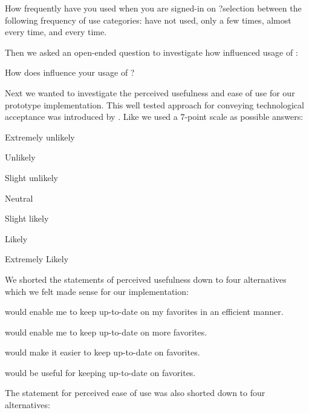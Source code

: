 \begin{items}
  \item How frequently have you used \latest{} when you are
    signed-in on \urort{}?\dash{}selection between the following
    frequency of use categories: have not used, only a few times, almost
    every time, and every time.
\end{items}

Then we asked an open-ended question to investigate how \latest{} influenced
usage of \urort{}:

\begin{items}
  \item How does \latest{} influence your usage of \urort{}?
\end{items}

Next we wanted to investigate the perceived usefulness and ease of use for
our prototype implementation. This well tested approach for conveying
technological acceptance was introduced by \citet{davis89}.
Like \citet[]{davis89} we used a 7-point scale as possible answers:

\begin{items}
  \item Extremely unlikely
  \item Unlikely
  \item Slight unlikely
  \item Neutral
  \item Slight likely
  \item Likely
  \item Extremely Likely
\end{items}

We shorted the statements of perceived usefulness down to four alternatives
which we felt made sense for our implementation:

\begin{items}
  \item \latest{} would enable me to keep up-to-date on my favorites in an
    efficient manner.
  \item \latest{} would enable me to keep up-to-date on more favorites.
  \item \latest{} would make it easier to keep up-to-date on favorites.
  \item \latest{} would be useful for keeping up-to-date on favorites.
\end{items}

The statement for perceived ease of use was also shorted down to four
alternatives:

